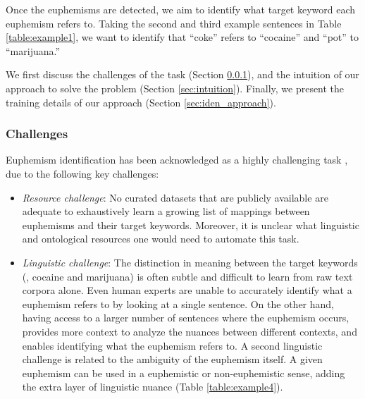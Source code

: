 Once the euphemisms are detected, we aim to identify what target keyword each euphemism refers to. 
Taking the second and third example sentences in Table \ref{table:example1}, we want to identify that ``coke'' refers to ``cocaine'' and  ``pot''  to  ``marijuana.'' 

We first discuss the challenges of the task (Section \ref{sec:iden_challenges}), and the  intuition of our approach to solve the problem (Section \ref{sec:intuition}). Finally, we present the training details of our approach (Section \ref{sec:iden_approach}). 

\subsubsection{Challenges}
\label{sec:iden_challenges}
Euphemism identification has been acknowledged as a highly challenging task \cite{yuan2018reading}, due to the following key challenges: 
\begin{itemize}%
	\item \textit{Resource challenge}: 
	No curated datasets that are publicly available are adequate to exhaustively learn a growing list of mappings between euphemisms and their target keywords. Moreover, it is unclear what linguistic and ontological resources one would need to automate this task.  
	\item \textit{Linguistic challenge}: 
	The distinction in meaning between the target keywords  (\eg, cocaine and marijuana) is often subtle and difficult to learn from raw text corpora alone. 
	Even human experts are unable to accurately identify what a euphemism refers to by looking at a single  sentence. 
	On the other hand, having access to a larger number of  sentences where the euphemism occurs, provides more context to analyze the nuances between different contexts, and enables identifying what the euphemism refers to. 
	A second linguistic challenge is related to the ambiguity of the euphemism itself. 
	A given euphemism can  be used in a euphemistic or non-euphemistic sense, adding the extra layer of linguistic nuance (Table \ref{table:example4}). 
\end{itemize}



